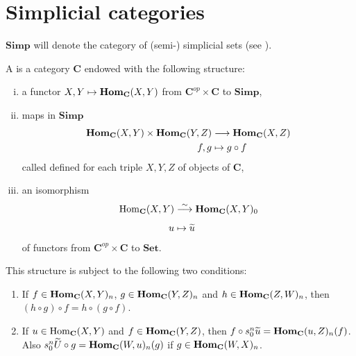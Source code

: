 \documentclass[../main]{subfiles}
\begin{document}
\section{Simplicial categories}\label{sec:2.1}
$\mathbf{Simp}$ will denote the category of (semi-) simplicial sets (see \cite{gabriel_calculus_1967}).

\begin{definition}
\label{def:2.1.01}
A  is a category $\mathbf C$ endowed with the following structure:
\begin{enumerate}[(i)]
    \item\label{def:2.1.01_i} a functor $X,Y \mapsto \operatorname{\mathbf{Hom}}_{\mathbf C}(X,Y)$ from $\mathbf C^{op} \times \mathbf C$ to $\mathbf{Simp}$,
    
    \item\label{def:2.1.01_ii} maps in $\mathbf{Simp}$
    \begin{align*}
        \operatorname{\mathbf{Hom}}_{\mathbf C}(X,Y) \times \operatorname{\mathbf{Hom}}_{\mathbf C}(Y,Z) &\longrightarrow \operatorname{\mathbf{Hom}}_{\mathbf C}(X,Z)\\
        f,g &\mapsto g \circ f
    \end{align*}
    called  defined for each triple $X,Y,Z$ of objects of $\mathbf C$,
    
    \item\label{def:2.1.01_iii} an isomorphism 
    \begin{align*}
        \Hom_{\mathbf C}(X,Y) &\varrightarrow \sim \UHom_{\mathbf C}(X,Y)_0 \\
        u &\mapsto \xtilde u
    \end{align*}
    of functors from $\mathbf C^{op} \times \mathbf C$ to $\mathbf{Set}$. %
\end{enumerate}
This structure is subject to the following two conditions: 
\begin{enumerate}[label = (\arabic*)]
    \item If $f \in \operatorname{\mathbf{Hom}}_{\mathbf C}(X,Y)_n$, $g \in \operatorname{\mathbf{Hom}}_{\mathbf C}(Y,Z)_n$ and $h \in \operatorname{\mathbf{Hom}}_{\mathbf C}(Z, W)_n$, then $(h \circ g) \circ f = h \circ (g \circ f)$. 
    
    \item If $u \in \operatorname{Hom}_{\mathbf C}(X, Y)$ and $f \in \operatorname{\mathbf{Hom}}_{\mathbf C}(Y,Z)$, then $f \circ s^n_0 \xtilde u = \UHom_{\mathbf C}(u, Z)_n(f)$. Also $s^n_0 \xtilde U \circ g = \UHom_{\mathbf C}(W, u)_n(g)$ if $g \in \operatorname{\mathbf{Hom}}_{\mathbf C}(W, X)_n$. 
\end{enumerate}
\end{definition}
\end{document}

